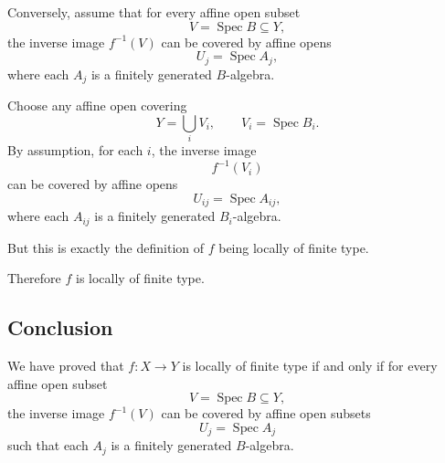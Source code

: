Conversely, assume that for every affine open subset
\[
V=\operatorname{Spec} B\subseteq Y,
\]
the inverse image \(f^{-1}(V)\) can be covered by affine opens
\[
U_j=\operatorname{Spec} A_j,
\]
where each \(A_j\) is a finitely generated \(B\)-algebra.

Choose any affine open covering
\[
Y=\bigcup_i V_i,
\qquad
V_i=\operatorname{Spec} B_i.
\]
By assumption, for each \(i\), the inverse image
\[
f^{-1}(V_i)
\]
can be covered by affine opens
\[
U_{ij}=\operatorname{Spec} A_{ij},
\]
where each \(A_{ij}\) is a finitely generated \(B_i\)-algebra.

But this is exactly the definition of \(f\) being locally of finite type.

Therefore \(f\) is locally of finite type.

\subsection*{Conclusion}

We have proved that \(f:X\to Y\) is locally of finite type if and only if for every affine open subset
\[
V=\operatorname{Spec} B\subseteq Y,
\]
the inverse image \(f^{-1}(V)\) can be covered by affine open subsets
\[
U_j=\operatorname{Spec} A_j
\]
such that each \(A_j\) is a finitely generated \(B\)-algebra.
